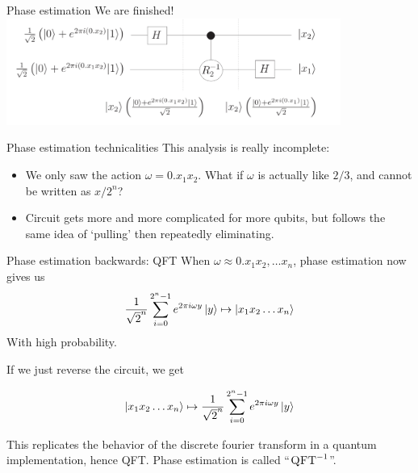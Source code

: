 \documentclass{beamer}
\begin{document}
\begin{frame}{Phase estimation}
    We are finished!
    \centering \includegraphics[height=3.5cm]{phase-estimation.png}
\end{frame}
\begin{frame}{Phase estimation technicalities}
This analysis is really incomplete:
\begin{itemize}
    \item We only saw the action $\omega = 0.x_1 x_2$. What if $\omega$ is actually like $2/3$, and cannot be written as $x/2^n$? \pause 
    
    \item Circuit gets more and more complicated for more qubits, but follows the same idea of `pulling' then repeatedly eliminating.
\end{itemize}
\end{frame}
\begin{frame}{Phase estimation backwards: QFT}
    When $\omega \approx 0.x_1 x_2, \ldots x_n$, phase estimation now gives us
    $$
    \frac{1}{\sqrt{2}^n} \sum_{i = 0}^{2^n - 1} e^{2 \pi i \omega y} \ket{y} \mapsto \ket{x_1 x_2 \ldots x_n}$$
    With high probability. \pause
    
    If we just reverse the circuit, we get
    
    $$
     \ket{x_1 x_2 \ldots x_n}  \mapsto \frac{1}{\sqrt{2}^n} \sum_{i = 0}^{2^n - 1} e^{2 \pi i \omega y} \ket{y}
     $$
     
     \pause This replicates the behavior of the discrete fourier transform in a quantum implementation, hence QFT. Phase estimation is called ``$\textsc{QFT}^{-1}$''.
\end{frame}
\end{document}
